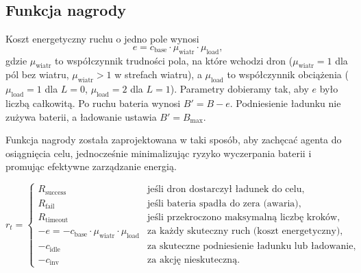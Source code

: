\documentclass[12pt]{article}
\begin{document}
\subsection{Funkcja nagrody}

Koszt energetyczny ruchu o jedno pole wynosi
\begin{equation}
 e = c_{\text{base}} \cdot \mu_{\text{wiatr}} \cdot \mu_{\text{load}},
\end{equation}
gdzie $\mu_{\text{wiatr}}$ to współczynnik trudności pola, na które wchodzi dron ($\mu_{\text{wiatr}} = 1$ dla pól bez wiatru, $\mu_{\text{wiatr}} > 1$ w strefach wiatru), a $\mu_{\text{load}}$ to współczynnik obciążenia ($\mu_{\text{load}} = 1$ dla $L = 0$, $\mu_{\text{load}} = 2$ dla $L = 1$). Parametry dobieramy tak, aby $e$ było liczbą całkowitą. Po ruchu bateria wynosi $B' = B - e$. Podniesienie ładunku nie zużywa baterii, a ładowanie ustawia $B' = B_{\max}$.

Funkcja nagrody została zaprojektowana w taki sposób, aby zachęcać agenta do osiągnięcia celu, jednocześnie minimalizując ryzyko wyczerpania baterii i promując efektywne zarządzanie energią.

\begin{equation}
 r_t =
 \begin{cases}
  R_{\text{success}} & \text{jeśli dron dostarczył ładunek do celu,} \\[2mm]
  R_{\text{fail}} & \text{jeśli bateria spadła do zera (awaria),} \\[2mm]
  R_{\text{timeout}} & \text{jeśli przekroczono maksymalną liczbę kroków,} \\[2mm]
  -e = -c_{\text{base}} \cdot \mu_{\text{wiatr}} \cdot \mu_{\text{load}} & \text{za każdy skuteczny ruch (koszt energetyczny),} \\[2mm]
  -c_{\text{idle}} & \text{za skuteczne podniesienie ładunku lub ładowanie,} \\[2mm]
  -c_{\text{inv}} & \text{za akcję nieskuteczną.}
 \end{cases}
\end{equation}
\end{document}
